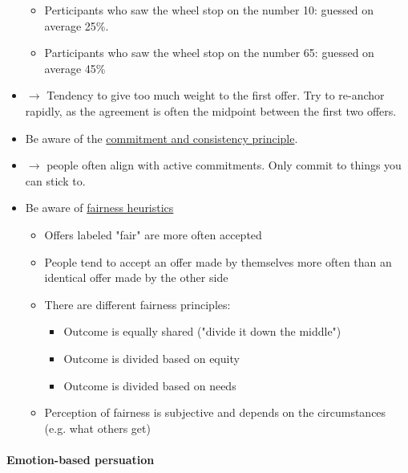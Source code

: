 \begin{itemize}
        \begin{itemize}
            \item Perticipants who saw the wheel stop on the number 10:
                guessed on average 25\%.
            \item Participants who saw the wheel stop on the number 65:
                guessed on average 45\%
        \end{itemize}
    \item $\rightarrow$ Tendency to give too much weight to the first offer.
        Try to re-anchor rapidly, as the agreement is often the midpoint between
        the first two offers.
    \item Be aware of the \underline{commitment and consistency principle}.
    \item $\rightarrow$ people often align with active commitments. Only commit
        to things you can stick to.
    \item Be aware of \underline{fairness heuristics}
        \begin{itemize}
            \item Offers labeled "fair" are more often accepted
            \item People tend to accept an offer made by themselves more often
                than an identical offer made by the other side
            \item There are different fairness principles:
                \begin{itemize}
                    \item Outcome is equally shared ("divide it down the middle")
                    \item Outcome is divided based on equity
                    \item Outcome is divided based on needs
                \end{itemize}
            \item Perception of fairness is subjective and depends on the
                circumstances (e.g. what others get)
        \end{itemize}
\end{itemize}

\paragraph{Emotion-based persuation}

